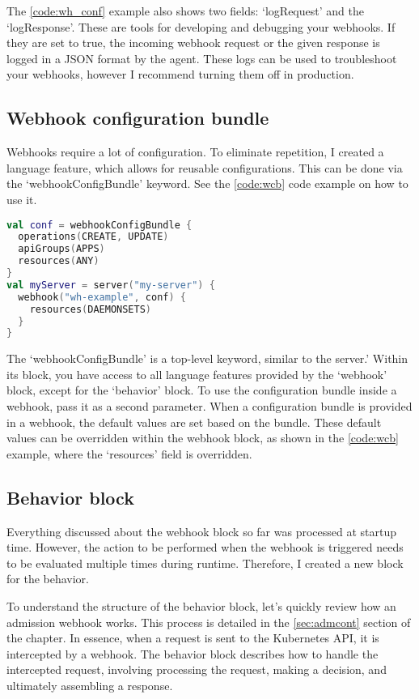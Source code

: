 The \ref{code:wh_conf} example also shows two fields: `logRequest' and the `logResponse'. These are tools for developing and debugging your webhooks. If they are set to true, the incoming webhook request or the given response is logged in a JSON format by the agent. These logs can be used to troubleshoot your webhooks, however I recommend turning them off in production.

\subsection{Webhook configuration bundle}

Webhooks require a lot of configuration. To eliminate repetition, I created a language feature, which allows for reusable configurations. This can be done via the `webhookConfigBundle' keyword. See the \ref{code:wcb} code example on how to use it.

\begin{lstlisting}[caption={Webhook configuration bundle},language=Kotlin,label=code:wcb]
val conf = webhookConfigBundle {
  operations(CREATE, UPDATE)
  apiGroups(APPS)
  resources(ANY)
}
val myServer = server("my-server") {
  webhook("wh-example", conf) {
    resources(DAEMONSETS)
  }
}
\end{lstlisting}

The `webhookConfigBundle' is a top-level keyword, similar to the server.' Within its block, you have access to all language features provided by the `webhook' block, except for the `behavior' block. To use the configuration bundle inside a webhook, pass it as a second parameter. When a configuration bundle is provided in a webhook, the default values are set based on the bundle. These default values can be overridden within the webhook block, as shown in the \ref{code:wcb} example, where the `resources' field is overridden.

\subsection{Behavior block}

Everything discussed about the webhook block so far was processed at startup time. However, the action to be performed when the webhook is triggered needs to be evaluated multiple times during runtime. Therefore, I created a new block for the behavior.

To understand the structure of the behavior block, let's quickly review how an admission webhook works. This process is detailed in the \ref{sec:admcont} section of the  chapter. In essence, when a request is sent to the Kubernetes API, it is intercepted by a webhook. The behavior block describes how to handle the intercepted request, involving processing the request, making a decision, and ultimately assembling a response.


